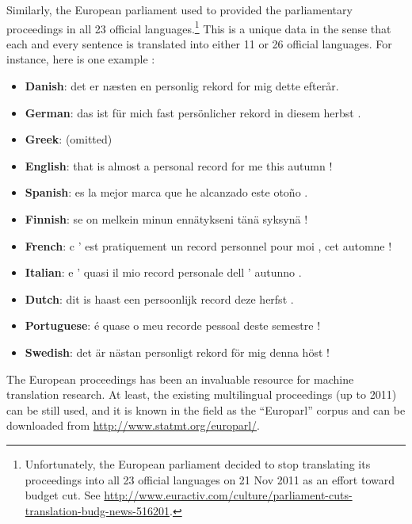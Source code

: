 \documentclass{report}
\begin{document}
Similarly, the European parliament used to provided the parliamentary
proceedings in all 23 official languages.\footnote{
    Unfortunately, the European parliament decided to stop translating its
    proceedings into all 23 official languages on 21 Nov 2011 as an effort
    toward budget cut. See
    \url{http://www.euractiv.com/culture/parliament-cuts-translation-budg-news-516201}.
} This is a unique data in the sense that each and every sentence is translated
into either 11 or 26 official languages. For instance, here is one example
\cite{koehn2005europarl}:
\begin{itemize}
    \itemsep 0em
    \item {\bf Danish}: det er næsten en personlig rekord for mig dette
        efter{\aa}r.
    \item {\bf German}: das ist f\"ur mich fast pers\"onlicher rekord in diesem
        herbst .
    \item {\bf Greek}: (omitted)
    \item {\bf English}: that is almost a personal record for me this autumn !
    \item {\bf Spanish}: es la mejor marca que he alcanzado este oto\~no .
    \item {\bf Finnish}: se on melkein minun enn\"atykseni t\"an\"a syksyn\"a !
    \item {\bf French}: c ' est pratiquement un record personnel pour moi , cet
        automne !
    \item {\bf Italian}: e ' quasi il mio record personale dell ' autunno .
    \item {\bf Dutch}: dit is haast een persoonlijk record deze herfst .
    \item {\bf Portuguese}: \'e quase o meu recorde pessoal deste semestre !
    \item {\bf Swedish}: det \"ar n\"astan personligt rekord f\"or mig denna h\"ost !
\end{itemize}

The European proceedings has been an invaluable resource for machine translation
research. At least, the existing multilingual proceedings (up to 2011) can be
still used, and it is known in the field as the ``Europarl'' corpus
\cite{koehn2005europarl} and can be downloaded from
\url{http://www.statmt.org/europarl/}. 
\end{document}
